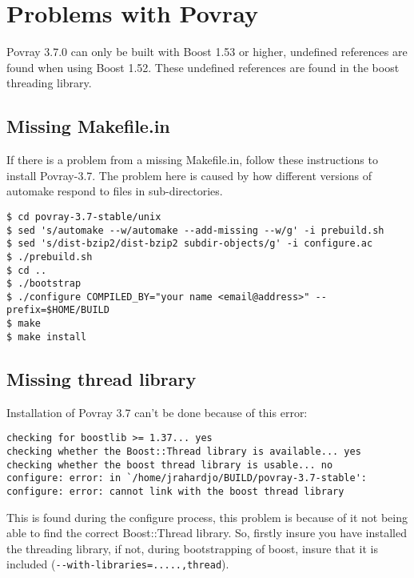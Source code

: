 \section{Problems with Povray} %
\label{sec:problems_with_povray}

Povray 3.7.0 can only be built with Boost 1.53 or higher, undefined references are found when using Boost 1.52. These undefined references are found in the boost threading library.

\subsection{Missing Makefile.in} %
\label{sub:missing_makefile_in}

If there is a problem from a missing Makefile.in, follow these instructions to install Povray-3.7. The problem here is caused by how different versions of automake respond to files in sub-directories.

\begin{lstlisting}[style=inlineBash]
$ cd povray-3.7-stable/unix
$ sed 's/automake --w/automake --add-missing --w/g' -i prebuild.sh
$ sed 's/dist-bzip2/dist-bzip2 subdir-objects/g' -i configure.ac
$ ./prebuild.sh
$ cd ..
$ ./bootstrap
$ ./configure COMPILED_BY="your name <email@address>" --prefix=$HOME/BUILD
$ make
$ make install
\end{lstlisting}

\subsection{Missing thread library} %
\label{sub:missing_thread_library}

Installation of Povray 3.7 can't be done because of this error:
\begin{lstlisting}[style=inlineBash]
checking for boostlib >= 1.37... yes
checking whether the Boost::Thread library is available... yes
checking whether the boost thread library is usable... no
configure: error: in `/home/jrahardjo/BUILD/povray-3.7-stable':
configure: error: cannot link with the boost thread library
\end{lstlisting}

This is found during the configure process, this problem is because of it not being able to find the correct Boost::Thread library. So, firstly insure you have installed the threading library, if not, during bootstrapping of boost, insure that it is included (\lstinline{--with-libraries=.....,thread}).

